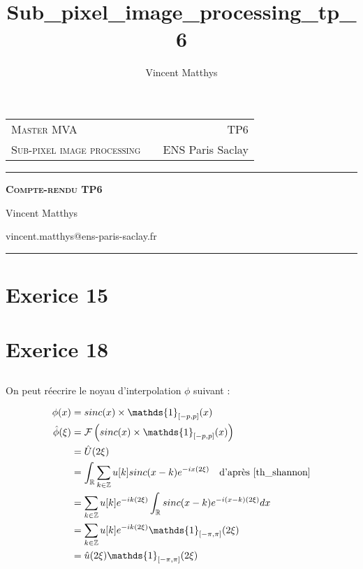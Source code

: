 \documentclass[12pt,a4paper,onecolumn]{article}
\title{Sub_pixel_image_processing_tp_6}
\author{Vincent Matthys}
\begin{document}
\begin{tabularx}{0.9\textwidth}{@{} l X r @{} }
	{\textsc{Master MVA}}               &  & \textsc{TP6}       \\
	\textsc{Sub-pixel image processing} &  & {ENS Paris Saclay} \\
\end{tabularx}
\vspace{1.5cm}
\begin{center}

	\rule[11pt]{5cm}{0.5pt}

	\textbf{\LARGE \textsc{Compte-rendu TP6}}
	\vspace{0.5cm}

	Vincent Matthys

	vincent.matthys@ens-paris-saclay.fr

	\rule{5cm}{0.5pt}

	\vspace{1.5cm}
\end{center}


\setcounter{section}{14}
\section{Exerice 15}


\setcounter{section}{17}
\section{Exerice 18}

\subsection{}

On peut réecrire le noyau d'interpolation \(\phi\) suivant :

\begin{equation}
	\begin{split}
		\phi(x) &= sinc(x) \times \mathds{1}_{[-p, p]}(x)\\
		\hat{\phi}(\xi) &= \mathcal{F}\left(sinc(x) \times \mathds{1}_{[-p, p]}(x)\right)\\
		&= \hat{U}(2\xi)\\
		&=  \int_{\mathbb{R}}\sum_{k\in\mathbb{Z}} u[k]sinc(x-k) e^{-ix(2\xi)} \quad \text{d'après \eqref{th_shannon}}\\
		&= \sum_{k\in\mathbb{Z}} u[k] e^{-ik(2\xi)}\int_{\mathbb{R}} sinc(x-k) e^{-i(x-k)(2\xi)}dx\\
		&= \sum_{k\in\mathbb{Z}} u[k] e^{-ik(2\xi)} \mathds{1}_{[-\pi, \pi]}(2\xi)\\
		&= \hat{u}(2\xi)\mathds{1}_{[-\pi, \pi]}(2\xi)\\
	\end{split}
\end{equation}
\end{document}
